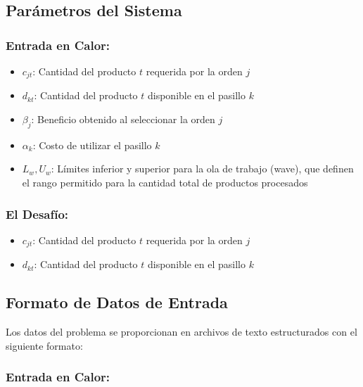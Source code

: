 \documentclass[a4paper,12pt]{article}
\begin{document}
\subsection{Parámetros del Sistema}

\subsubsection*{Entrada en Calor:} 

\begin{itemize}
    \item $c_{jt}$: Cantidad del producto $t$ requerida por la orden $j$
    \item $d_{kt}$: Cantidad del producto $t$ disponible en el pasillo $k$
    \item $\beta_j$: Beneficio obtenido al seleccionar la orden $j$
    \item $\alpha_k$: Costo de utilizar el pasillo $k$
    \item $L_w, U_w$: Límites inferior y superior para la ola de trabajo (wave), que definen el rango permitido para la cantidad total de productos procesados
\end{itemize}

\subsubsection*{El Desafío:}

\begin{itemize}
    \item $c_{jt}$: Cantidad del producto $t$ requerida por la orden $j$
    \item $d_{kt}$: Cantidad del producto $t$ disponible en el pasillo $k$

\end{itemize}

\subsection{Formato de Datos de Entrada}

Los datos del problema se proporcionan en archivos de texto estructurados con el siguiente formato:

\subsubsection*{Entrada en Calor:}
\end{document}
